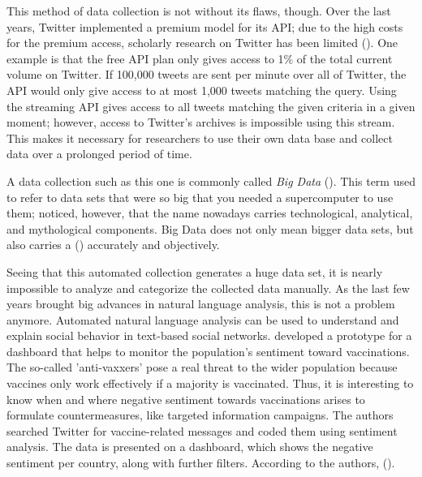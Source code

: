 This method of data collection is not without its flaws, though. Over the last years, Twitter implemented a premium model for its API; due to the high costs for the premium access, scholarly research on Twitter has been limited (\cite{bruns2014}). One example is that the free API plan only gives access to 1\% of the total current volume on Twitter. If 100,000 tweets are sent per minute over all of Twitter, the API would only give access to at most 1,000 tweets matching the query. Using the streaming API gives access to all tweets matching the given criteria in a given moment; however, access to Twitter's archives is impossible using this stream. This makes it necessary for researchers to use their own data base and collect data over a prolonged period of time.

A data collection such as this one is commonly called \emph{Big Data} (\cite{crawford2012}). This term used to refer to data sets that were so big that you needed a supercomputer to use them; \citeauthor{crawford2012} noticed, however, that the name nowadays carries technological, analytical, and mythological components. Big Data does not only mean bigger data sets, but also carries a  (\cite[3]{crawford2012}) accurately and objectively.

Seeing that this automated collection generates a huge data set, it is nearly impossible to analyze and categorize the collected data manually. As the last few years brought big advances in natural language analysis, this is not a problem anymore. Automated natural language analysis can be used to understand and explain social behavior in text-based social networks. \citeauthor{bahk2016publicly} developed a prototype for a dashboard that helps to monitor the population's sentiment toward vaccinations. The so-called 'anti-vaxxers' pose a real threat to the wider population because vaccines only work effectively if a majority is vaccinated. Thus, it is interesting to know when and where negative sentiment towards vaccinations arises to formulate countermeasures, like targeted information campaigns. The authors searched Twitter for vaccine-related messages and coded them using sentiment analysis. The data is presented on a dashboard, which shows the negative sentiment per country, along with further filters. According to the authors,  (\cite[343]{bahk2016publicly}).

